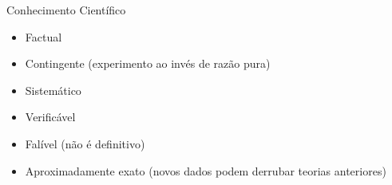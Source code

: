 \documentclass{beamer}
\begin{document}




\begin{frame}{Conhecimento Científico}
  \begin{itemize}
    \small
  \item Factual
    \smallskip
  \item Contingente (\alert{experimento} ao invés de razão pura)
    \smallskip
  \item Sistemático 
    \smallskip
  \item \alert{Verificável}
    \smallskip
  \item Falível (não é definitivo)
    \smallskip
  \item Aproximadamente exato (novos dados podem derrubar teorias
    anteriores)
  \end{itemize}
\end{frame}
\end{document}
